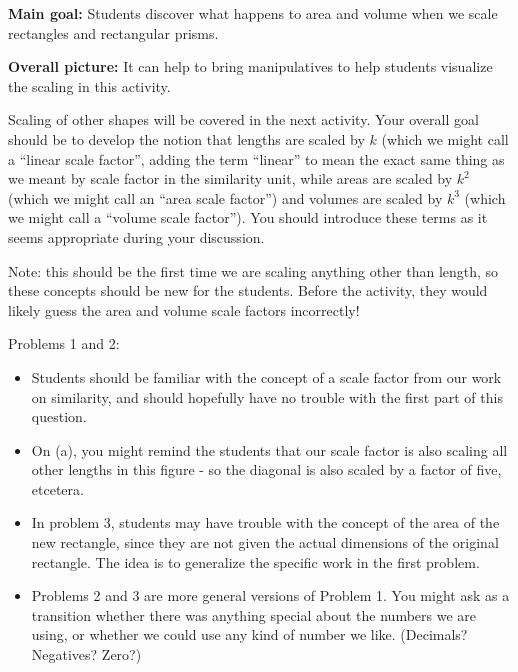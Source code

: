 \documentclass[nooutcomes,noauthor, handout]{ximera}
\begin{document}
\begin{instructorNotes}

{\bf Main goal:} Students discover what happens to area and volume when we scale rectangles and rectangular prisms.

{\bf Overall picture:} It can help to bring manipulatives to help students visualize the scaling in this activity.


Scaling of other shapes will be covered in the next activity.  Your overall goal should be to develop the notion that lengths are scaled by $k$ (which we might call a ``linear scale factor'', adding the term ``linear'' to mean the exact same thing as we meant by scale factor in the similarity unit, while areas are scaled by $k^2$ (which we might call an ``area scale factor'') and volumes are scaled by $k^3$ (which we might call a ``volume scale factor'').  You should introduce these terms as it seems appropriate during your discussion.

Note: this should be the first time we are scaling anything other than length, so these concepts should be new for the students.  Before the activity, they would likely guess the area and volume scale factors incorrectly!

Problems 1 and 2:
\begin{itemize}
\item Students should be familiar with the concept of a scale factor from our work on similarity, and should hopefully have no trouble with the first part of this question.  

\item On (a), you might remind the students that our scale factor is also scaling all other lengths in this figure - so the diagonal is also scaled by a factor of five, etcetera.

\item In problem 3, students may have trouble with the concept of the area of the new rectangle, since they are not given the actual dimensions of the original rectangle.  The idea is to generalize the specific work in the first problem.

\item Problems 2 and 3 are more general versions of Problem 1. You might ask as a transition whether there was anything special about the numbers we are using, or whether we could use any kind of number we like.  (Decimals?  Negatives?  Zero?)
\end{itemize}


\end{instructorNotes}
\end{document}
